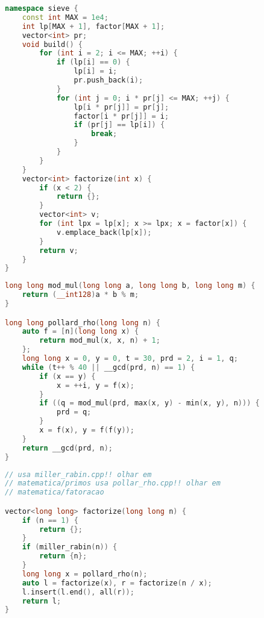 \documentclass[11pt, a4paper, oneside]{book}
\begin{document}
\hfill

\begin{multicols}{2}
\begin{lstlisting}[language=C++]
namespace sieve {
    const int MAX = 1e4;
    int lp[MAX + 1], factor[MAX + 1];
    vector<int> pr;
    void build() {
        for (int i = 2; i <= MAX; ++i) {
            if (lp[i] == 0) {
                lp[i] = i;
                pr.push_back(i);
            }
            for (int j = 0; i * pr[j] <= MAX; ++j) {
                lp[i * pr[j]] = pr[j];
                factor[i * pr[j]] = i;
                if (pr[j] == lp[i]) {
                    break;
                }
            }
        }
    }
    vector<int> factorize(int x) {
        if (x < 2) {
            return {};
        }
        vector<int> v;
        for (int lpx = lp[x]; x >= lpx; x = factor[x]) {
            v.emplace_back(lp[x]);
        }
        return v;
    }
}
\end{lstlisting}
\end{multicols}

\hfill

\begin{multicols}{2}
\begin{lstlisting}[language=C++]
long long mod_mul(long long a, long long b, long long m) {
    return (__int128)a * b % m;
}

long long pollard_rho(long long n) {
    auto f = [n](long long x) {
        return mod_mul(x, x, n) + 1;
    };
    long long x = 0, y = 0, t = 30, prd = 2, i = 1, q;
    while (t++ % 40 || __gcd(prd, n) == 1) {
        if (x == y) {
            x = ++i, y = f(x);
        }
        if ((q = mod_mul(prd, max(x, y) - min(x, y), n))) {
            prd = q;
        }
        x = f(x), y = f(f(y));
    }
    return __gcd(prd, n);
}
\end{lstlisting}
\end{multicols}

\hfill

\begin{multicols}{2}
\begin{lstlisting}[language=C++]
// usa miller_rabin.cpp!! olhar em
// matematica/primos usa pollar_rho.cpp!! olhar em
// matematica/fatoracao

vector<long long> factorize(long long n) {
    if (n == 1) {
        return {};
    }
    if (miller_rabin(n)) {
        return {n};
    }
    long long x = pollard_rho(n);
    auto l = factorize(x), r = factorize(n / x);
    l.insert(l.end(), all(r));
    return l;
}
\end{lstlisting}
\end{multicols}
\end{document}

